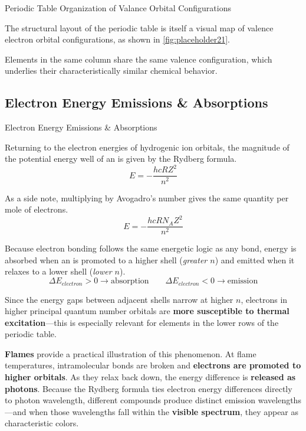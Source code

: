 \documentclass[10pt]{article}
\begin{document}
    \begin{core}{Periodic Table Organization of Valance Orbital Configurations}

      The structural layout of the periodic table is itself a visual map of valence electron orbital configurations, as shown in \autoref{fig:placeholder21}.


      Elements in the same column share the same valence  configuration, which underlies their characteristically similar chemical behavior.
      
    \end{core}

  \subsection{Electron Energy Emissions \& Absorptions}

    \begin{core}{Electron Energy Emissions \& Absorptions}

      Returning to the electron energies of hydrogenic ion orbitals, the magnitude of the potential energy well of an  is given by the Rydberg formula.
      \[
        E = -\frac{hcRZ^2}{n^2}
      \]

      As a side note, multiplying by Avogadro's number gives the same quantity per mole of electrons.
      \[
        E = -\frac{hcRN_AZ^2}{n^2}
      \]

      Because electron bonding follows the same energetic logic as any bond, energy is absorbed when an  is promoted to a higher shell (\textit{greater $n$}) and emitted when it relaxes to a lower shell (\textit{lower $n$}).
      \[
        \Delta E_{electron} > 0 \rightarrow \text{absorption} \qquad \Delta E_{electron} < 0 \rightarrow \text{emission}
      \]

      Since the energy gaps between adjacent shells narrow at higher $n$, electrons in higher principal quantum number orbitals are \textbf{more susceptible to thermal excitation}---this is especially relevant for elements in the lower rows of the periodic table.

      \textbf{Flames} provide a practical illustration of this phenomenon. At flame temperatures, intramolecular bonds are broken and \textbf{electrons are promoted to higher orbitals}. As they relax back down, the energy difference is \textbf{released as photons}. Because the Rydberg formula ties electron energy differences directly to photon wavelength, different compounds produce distinct emission wavelengths---and when those wavelengths fall within the \textbf{visible spectrum}, they appear as characteristic colors.

    \end{core}
\end{document}
